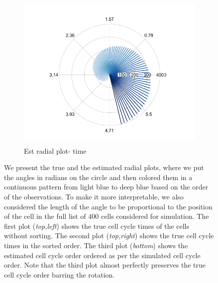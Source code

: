 \documentclass[11pt]{article}
\begin{document}
\begin{figure}[ht]
     \begin{subfigure}[t]{0.5\textwidth}
        \centering
        \includegraphics[height=3in]{../figures/cell_order_R_figs/estd_cell_order_100_classes_exp_2.png}
        \caption{Est radial plot- time}
    \end{subfigure}
    \caption{We present the true and the estimated radial plots, where we put the angles in radians on the circle and then colored them in a continuous pattern from light blue  to deep blue based on the order of the observations. To make it more interpretable, we also considered the length of the angle to be proportional to the position of the cell in the full list of $400$ cells considered for simulation. The first plot (\textit{top,left}) shows the true cell cycle times of the cells without sorting. The second plot (\textit{top,right}) shows the true cell cycle times in the sorted order. The third plot (\textit{bottom}) shows the estimated cell cycle order ordered as per the simulated cell cycle order. Note that the third plot almost perfectly preserves the true cell cycle order barring the rotation.}
 \label{fig:fig3}
 \end{figure}
\end{document}
